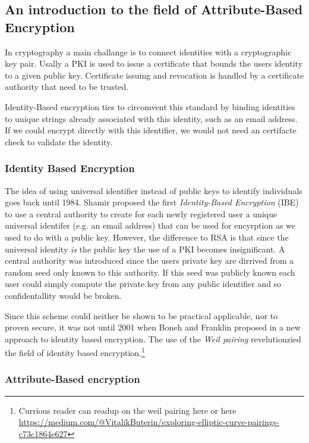 \subsection{An introduction to the field of Attribute-Based Encryption}
In cryptography a main challange is to connect identities with a cryptographic key pair. Usally a \ac{PKI} is used to issue a certificate that bounds the users identity to a given public key. Certificate issuing and revocation is handled by a certificate authority that need to be trusted. 

Identity-Based encryption ties to circomvent this standard by binding identities to unique strings already associated with this identity, such as an email address. If we could encrypt directly with this identifier, we would not need an certifacte check to validate the identity. 

\subsubsection{Identity Based Encryption}
The idea of using universal identifier instead of public keys to identify individuals goes back until 1984. Shamir proposed the first \textit{Identity-Based Encryption} (\ac{IBE}) \cite{shamir1984identity} to use a central authority to create for each newly registered user a unique universal identifer (e.g. an email address) that can be used for encyrption as we used to do with a public key. However, the difference to \ac{RSA} is that since the universal identity \textit{is} the public key the use of a \ac{PKI} becomes insignificant. A central authority was introduced since the users private key are dirrived from a random seed only known to this authority. If this seed was publicly known each user could simply compute the private key from any public identifier and so confidentallity would be broken. 

Since this scheme could neither be shown to be practical applicable, nor to proven secure, it was not until 2001 when Boneh and Franklin proposed in \cite{boneh2001identity} a new approach to identity based encryption. The use of the \textit{Weil pairing} revelutionzied the field of identity based encryption.\footnote{Currious reader can readup on the weil pairing here \cite{Miller2004} \cite{galbraith2008pairings} or here \url{https://medium.com/@VitalikButerin/exploring-elliptic-curve-pairings-c73c1864e627}} 

\subsubsection{Attribute-Based encryption}

